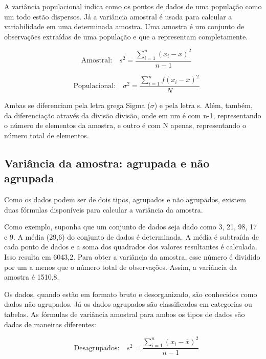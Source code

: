 A variância populacional indica como os pontos de dados de uma população como um todo estão dispersos. Já a variância amostral é usada para calcular a variabilidade em uma determinada amostra. Uma amostra é um conjunto de observações extraídas de uma população e que a representam completamente.

\begin{equation}
    \quad\mbox{Amostral:}\quad
    s^{2} = \frac{\sum_{i=1}^{n} (x_{i} - \bar{x})^{2}}{n - 1}
\end{equation}

\begin{equation}
    \quad\mbox{Populacional:}\quad
    \sigma^{2} = \frac{\sum_{i=1}^{n} f(x_{i} - \bar{x})^{2}}{N}
    \label{eq:variancia_populacional}
\end{equation}

Ambas se diferenciam pela letra grega Sigma (\(\sigma\)) e pela letra s. Além, também, da diferenciação através da divisão divisão, onde em um é com n-1, representando o número de elementos da amostra, e outro é com N apenas, representando o número total de elementos.

\subsection{Variância da amostra: agrupada e não agrupada}
Como os dados podem ser de dois tipos, agrupados e não agrupados, existem duas fórmulas disponíveis para calcular a variância da amostra.

Como exemplo, suponha que um conjunto de dados seja dado como 3, 21, 98, 17 e 9. A média (29,6) do conjunto de dados é determinada. A média é subtraída de cada ponto de dados e a soma dos quadrados dos valores resultantes é calculada. Isso resulta em 6043,2. Para obter a variância da amostra, esse número é dividido por um a menos que o número total de observações. Assim, a variância da amostra é 1510,8.

Os dados, quando estão em formato bruto e desorganizado, são conhecidos como dados não agrupados. Já os dados agrupados são classificados em categorias ou tabelas. As fórmulas de variância amostral para ambos os tipos de dados são dadas de maneiras diferentes:

\begin{equation}
    \quad\mbox{Desagrupados:}\quad
    s^{2} = \frac{\sum_{i=1}^{n} (x_{i} - \bar{x})^{2}}{n - 1}
\end{equation}

